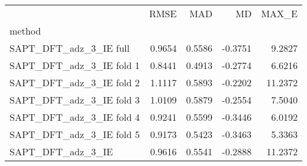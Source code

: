 \begin{tabular}{lrrrr}
 & RMSE & MAD & MD & MAX_E \\
method &  &  &  &  \\
SAPT_DFT_adz_3_IE full & 0.9654 & 0.5586 & -0.3751 & 9.2827 \\
SAPT_DFT_adz_3_IE fold 1 & 0.8441 & 0.4913 & -0.2774 & 6.6216 \\
SAPT_DFT_adz_3_IE fold 2 & 1.1117 & 0.5893 & -0.2202 & 11.2372 \\
SAPT_DFT_adz_3_IE fold 3 & 1.0109 & 0.5879 & -0.2554 & 7.5040 \\
SAPT_DFT_adz_3_IE fold 4 & 0.9241 & 0.5599 & -0.3446 & 6.0192 \\
SAPT_DFT_adz_3_IE fold 5 & 0.9173 & 0.5423 & -0.3463 & 5.3363 \\
SAPT_DFT_adz_3_IE & 0.9616 & 0.5541 & -0.2888 & 11.2372 \\
\end{tabular}

